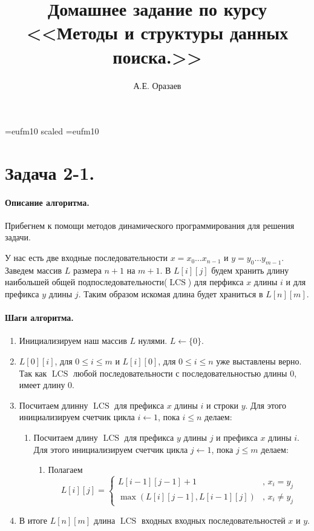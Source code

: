 \documentclass[12pt]{article}
\title{\bf Домашнее задание по курсу \\ <<Методы
и структуры данных поиска.>>}
\author{А.Е. Оразаев}
\date{}
\newcommand{\LCS}{\operatorname{LCS}}
\begin{document}
\voffset=-20mm 
\hoffset=-12mm
\font\Got=eufm10 scaled \font\Got=eufm10

\maketitle

\section{Задача 2-1.}
\paragraph{Описание алгоритма.}
Прибегнем к помощи методов динамического программирования для решения задачи.

У нас есть две входные последовательности $ x = x_0 \dots x_{n - 1} $ и
$ y = y_0 \dots y_{m - 1} $. Заведем массив $ L $ размера $ n + 1 $ на
$ m + 1 $. В $ L[i][j] $ будем хранить длину наибольшей общей 
подпоследовательности($ \LCS $) для перфикса $ x $ длины $ i $ и для префикса $ y $
длины $ j $. Таким образом искомая длина будет храниться в $ L[n][m] $.

\paragraph{Шаги алгоритма.}
\begin{enumerate}
    \item Инициализируем наш массив $ L $ нулями. $ L \leftarrow \{0\} $.

    \item $ L[0][i] $, для $ 0 \le i \le m $ и $ L[i][0] $, для $ 0 \le i \le n $ 
    уже выставлены верно. Так как $ \LCS $ любой
    последовательности с последовательностью длины 0, имеет длину 0.

    \item Посчитаем длинну $ \LCS $ для префикса $ x $
    длины $ i $ и строки $ y $. Для этого инициализируем счетчик цикла 
    $ i \leftarrow 1 $, пока $ i \le n $ делаем:
    \begin{enumerate}
        \item Посчитаем длину $ \LCS $ для префикса 
        $ y $ длины $ j $ и префикса $ x $ длины $ i $. Для этого инициализируем
        счетчик цикла $ j \leftarrow 1 $, пока $ j \le m $ делаем:
        \begin{enumerate}
            \item Полагаем 
            $$ L[i][j] = \left\{ 
                \begin{array}{ll}
                    L[i - 1][j - 1] + 1 &\mbox{, } x_i = y_j \\
                    \max(L[i][j - 1], L[i - 1][j]) &\mbox{, } x_i \ne y_j
                \end{array}
            \right.$$
        \end{enumerate}
    \end{enumerate}

    \item В итоге $ L[n][m] $ длина $ \LCS $ входных
    входных последовательностей $ x $ и $ y $.
\end{enumerate}
\end{document}
